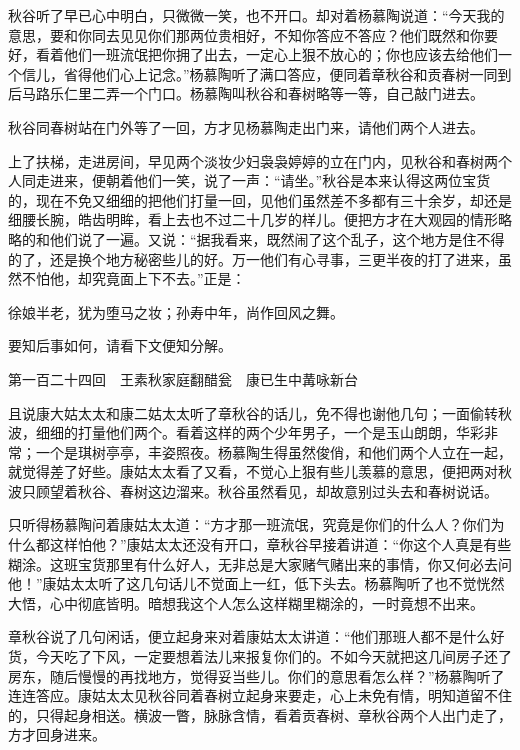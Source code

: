 \documentclass[12pt,UTF8]{ctexbook}
\begin{document}
{{{秋谷听了早已心中明白，只微微一笑，也不开口。却对着杨慕陶说道：“今天我的意思，要和你同去见见你们那两位贵相好，不知你答应不答应？他们既然和你要好，看着他们一班流氓把你拥了出去，一定心上狠不放心的；你也应该去给他们一个信儿，省得他们心上记念。”杨慕陶听了满口答应，便同着章秋谷和贡春树一同到后马路乐仁里二弄一个门口。杨慕陶叫秋谷和春树略等一等，自己敲门进去。

秋谷同春树站在门外等了一回，方才见杨慕陶走出门来，请他们两个人进去。

上了扶梯，走进房间，早见两个淡妆少妇袅袅婷婷的立在门内，见秋谷和春树两个人同走进来，便朝着他们一笑，说了一声：“请坐。”秋谷是本来认得这两位宝货的，现在不免又细细的把他们打量一回，见他们虽然差不多都有三十余岁，却还是细腰长腕，皓齿明眸，看上去也不过二十几岁的样儿。便把方才在大观园的情形略略的和他们说了一遍。又说：“据我看来，既然闹了这个乱子，这个地方是住不得的了，还是换个地方秘密些儿的好。万一他们有心寻事，三更半夜的打了进来，虽然不怕他，却究竟面上下不去。”正是：

徐娘半老，犹为堕马之妆；孙寿中年，尚作回风之舞。

要知后事如何，请看下文便知分解。





第一百二十四回　王素秋家庭翻醋瓮　康已生中冓咏新台





且说康大姑太太和康二姑太太听了章秋谷的话儿，免不得也谢他几句；一面偷转秋波，细细的打量他们两个。看着这样的两个少年男子，一个是玉山朗朗，华彩非常；一个是琪树亭亭，丰姿照夜。杨慕陶生得虽然俊俏，和他们两个人立在一起，就觉得差了好些。康姑太太看了又看，不觉心上狠有些儿羡慕的意思，便把两对秋波只顾望着秋谷、春树这边溜来。秋谷虽然看见，却故意别过头去和春树说话。

只听得杨慕陶问着康姑太太道：“方才那一班流氓，究竟是你们的什么人？你们为什么都这样怕他？”康姑太太还没有开口，章秋谷早接着讲道：“你这个人真是有些糊涂。这班宝货那里有什么好人，无非总是大家赌气赌出来的事情，你又何必去问他！”康姑太太听了这几句话儿不觉面上一红，低下头去。杨慕陶听了也不觉恍然大悟，心中彻底皆明。暗想我这个人怎么这样糊里糊涂的，一时竟想不出来。

章秋谷说了几句闲话，便立起身来对着康姑太太讲道：“他们那班人都不是什么好货，今天吃了下风，一定要想着法儿来报复你们的。不如今天就把这几间房子还了房东，随后慢慢的再找地方，觉得妥当些儿。你们的意思看怎么样？”杨慕陶听了连连答应。康姑太太见秋谷同着春树立起身来要走，心上未免有情，明知道留不住的，只得起身相送。横波一瞥，脉脉含情，看着贡春树、章秋谷两个人出门走了，方才回身进来。

}}}
\end{document}
